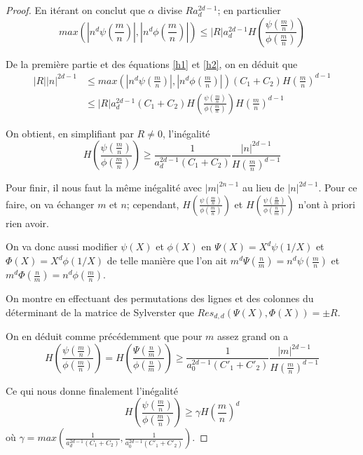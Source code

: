\documentclass{article}
\begin{document}
\begin{proof}
En itérant on conclut que $\alpha$ divise $Ra_{d}^{2d-1}$; en particulier
\begin{equation}
\label{h2}
max(|n^d\psi(\frac{m}{n})|, |n^d\phi(\frac{m}{n})|) \leq |R|a_{d}^{2d-1} H(\frac{\psi(\frac{m}{n})}{\phi(\frac{m}{n})})
\end{equation}

De la première partie et des équations \ref{h1} et \ref{h2}, on en déduit que
\begin{align*}
|R||n|^{2d-1} &\leq max(|n^d\psi(\frac{m}{n})|, |n^d\phi(\frac{m}{n})|)(C_{1} + C_{2})H(\frac{m}{n})^{d-1} \\
			&\leq |R|a_{d}^{2d-1}(C_{1} + C_{2})H(\frac{\psi(\frac{m}{n})}{\phi(\frac{m}{n})})H(\frac{m}{n})^{d-1}
\end{align*}

On obtient, en simplifiant par $R \neq 0$, l'inégalité
\begin{equation*}
H(\frac{\psi(\frac{m}{n})}{\phi(\frac{m}{n})}) \geq \frac{1}{a_{d}^{2d-1}(C_{1} + C_{2})}\frac{|n|^{2d-1}}{H(\frac{m}{n})^{d-1}}
\end{equation*}

Pour finir, il nous faut la même inégalité avec $|m|^{2n-1}$ au lieu de $|n|^{2d-1}$. Pour ce faire, on va échanger $m$ et $n$; cependant, $H(\frac{\psi(\frac{m}{n})}{\phi(\frac{m}{n})})$ et $H(\frac{\psi(\frac{n}{m})}{\phi(\frac{n}{m})})$
n'ont à priori rien avoir.

On va donc aussi modifier $\psi(X)$ et $\phi(X)$ en $\Psi(X) = X^d\psi(1/X)$ et $\Phi(X) = X^d\phi(1/X)$
de telle manière que l'on ait $m^d\Psi(\frac{n}{m}) = n^d\psi(\frac{m}{n})$ et $m^d\Phi(\frac{n}{m}) = n^d\phi(\frac{m}{n})$.

On montre en effectuant des permutations des lignes et des colonnes du déterminant de la matrice de Sylverster
que $Res_{d,d}(\Psi(X), \Phi(X)) = \pm R$.

On en déduit comme précédemment que pour $m$ assez grand on a
\begin{equation*}
H(\frac{\psi(\frac{m}{n})}{\phi(\frac{m}{n})}) = H(\frac{\Psi(\frac{n}{m})}{\phi(\frac{n}{m})})
 \geq \frac{1}{a_{0}^{2d-1}(C'_{1} + C'_{2})}\frac{|m|^{2d-1}}{H(\frac{m}{n})^{d-1}}
\end{equation*}

Ce qui nous donne finalement l'inégalité
\begin{equation*}
H(\frac{\psi(\frac{m}{n})}{\phi(\frac{m}{n})}) \geq \gamma H(\frac{m}{n})^{d}
\end{equation*}
où $\gamma = max(\frac{1}{a_{d}^{2d-1}(C_{1} + C_{2})}, \frac{1}{a_{0}^{2d-1}(C'_{1} + C'_{2})})$.
\end{proof}
\end{document}
